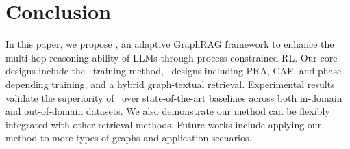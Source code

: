 \section{Conclusion}
In this paper, we propose \methodname, an adaptive GraphRAG framework to enhance the multi-hop reasoning ability of LLMs through process-constrained RL. 
Our core designs include the \rlname~training method, \rewardname~designs including PRA, CAF, and phase-depending training, and a hybrid graph-textual retrieval. 
Experimental results validate the superiority of \methodname~over state-of-the-art baselines across both in-domain and out-of-domain datasets. We also demonstrate our method can be flexibly integrated with other retrieval methods.  %
Future works include applying our method to more types of graphs and application scenarios.
